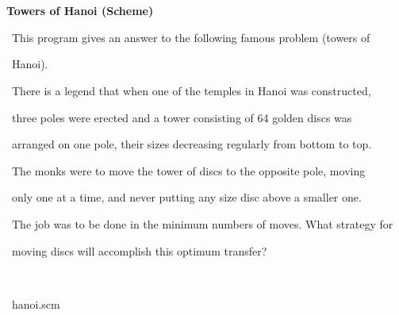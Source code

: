 \documentclass[a4paper,10pt]{article}
\def\mc{\relax}
\begin{document}
\tt\mc 

\noindent
\mbox{}\rm\mc {\tt ;} \hrulefill
\tt\mc 

\noindent
\mbox{}\rm\mc {\tt ;} \ %
\tt\mc 

\noindent
\mbox{}\rm\mc {\tt ;} \ \centerline{\bf Towers of Hanoi (Scheme)}
\tt\mc 

\noindent
\mbox{}\rm\mc {\tt ;} 
\tt\mc 

\noindent
\mbox{}\rm\mc {\tt ;} \ \hspace{\leftmargini}This program gives an answer to the following famous problem (towers of
\tt\mc 

\noindent
\mbox{}\rm\mc {\tt ;} \ \hspace{\leftmargini}Hanoi).
\tt\mc 

\noindent
\mbox{}\rm\mc {\tt ;} \ \hspace{\leftmargini}There is a legend that when one of the temples in Hanoi was constructed,
\tt\mc 

\noindent
\mbox{}\rm\mc {\tt ;} \ \hspace{\leftmargini}three poles were erected and a tower consisting of 64 golden discs was
\tt\mc 

\noindent
\mbox{}\rm\mc {\tt ;} \ \hspace{\leftmargini}arranged on one pole, their sizes decreasing regularly from bottom to top.
\tt\mc 

\noindent
\mbox{}\rm\mc {\tt ;} \ \hspace{\leftmargini}The monks were to move the tower of discs to the opposite pole, moving
\tt\mc 

\noindent
\mbox{}\rm\mc {\tt ;} \ \hspace{\leftmargini}only one at a time, and never putting any size disc above a smaller one.
\tt\mc 

\noindent
\mbox{}\rm\mc {\tt ;} \ \hspace{\leftmargini}The job was to be done in the minimum numbers of moves. What strategy for
\tt\mc 

\noindent
\mbox{}\rm\mc {\tt ;} \ \hspace{\leftmargini}moving discs will accomplish this optimum transfer?
\tt\mc 

\noindent
\mbox{}\rm\mc {\tt ;} \ %
\tt\mc 

\noindent
\mbox{}\rm\mc {\tt ;} \hrulefill\ hanoi.scm\ \hrulefill
\tt\mc 

\noindent
\mbox{}\hfill
\end{document}

